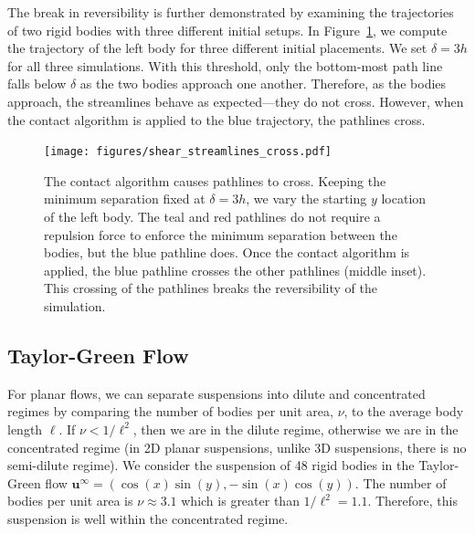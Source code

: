 \documentclass[AMA,STIX1COL]{WileyNJD-v2}
\begin{document}
The break in reversibility is further demonstrated by examining
the trajectories of two rigid bodies with three different initial
setups.  In Figure~\ref{fig:shear_cross}, we compute the
trajectory of the left body for three different initial placements.  We
set $\delta=3h$ for all three simulations.  With this threshold, only the
bottom-most path line falls below $\delta$ as the two bodies approach
one another.  Therefore, as the bodies approach, the streamlines behave
as expected---they do not cross.  However, when the contact algorithm is
applied to the blue trajectory, the pathlines cross.

\begin{figure}[t]
\centerline{\texttt{[image: figures/shear\_streamlines\_cross.pdf]}}
\caption{\label{fig:shear_cross} The contact algorithm causes pathlines
to cross. Keeping the minimum separation fixed at $\delta=3h$, we vary
the starting $y$ location of the left body. The teal and red pathlines
do not require a repulsion force to enforce the minimum separation
between the bodies, but the blue pathline does.  Once the contact
algorithm is applied, the blue pathline crosses the other pathlines
(middle inset). This crossing of the pathlines breaks the reversibility
of the simulation.}
\end{figure}


\subsection{Taylor-Green Flow}\label{sec:taylor_green}

For planar flows, we can separate suspensions into dilute and
concentrated regimes by comparing the number of bodies per unit area,
$\nu$, to the average body length $\ell$. If $\nu < 1/\ell^2$, then we
are in the dilute regime, otherwise we are in the concentrated regime
(in 2D planar suspensions, unlike 3D suspensions, there is no
semi-dilute regime).  We consider the suspension of 48 rigid bodies in
the Taylor-Green flow $\mathbf{u}^\infty = (\cos(x)\sin(y),
-\sin(x)\cos(y))$.  The number of bodies per unit area is $\nu \approx
3.1$ which is greater than $1/\ell^2=1.1$.  Therefore, this suspension
is well within the concentrated regime. 
\end{document}
